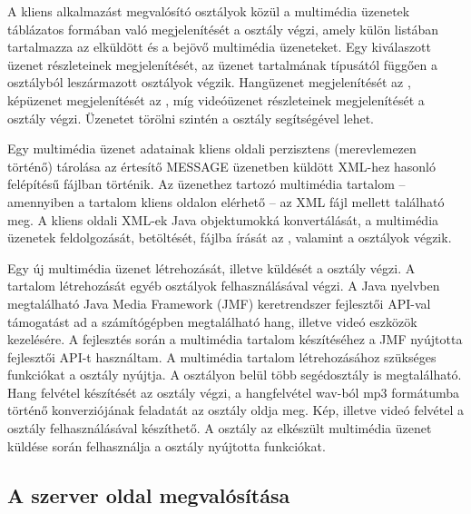 \medskip

A kliens alkalmazást megvalósító osztályok közül a multimédia üzenetek táblázatos formában való megjelenítését a  osztály végzi, amely külön listában tartalmazza az elküldött és a bejövő multimédia üzeneteket. Egy kiválaszott üzenet részleteinek megjelenítését, az üzenet tartalmának típusától függően a  osztályból leszármazott osztályok végzik. Hangüzenet megjelenítését az , képüzenet megjelenítését az , míg videóüzenet részleteinek megjelenítését a  osztály végzi. Üzenetet törölni szintén a  osztály segítségével lehet. 

\medskip

Egy multimédia üzenet adatainak kliens oldali perzisztens (merevlemezen történő) tárolása az értesítő MESSAGE üzenetben küldött XML-hez hasonló felépítésű fájlban történik. Az üzenethez tartozó multimédia tartalom -- amennyiben a tartalom kliens oldalon elérhető -- az XML fájl mellett található meg. A kliens oldali XML-ek Java objektumokká konvertálását, a multimédia üzenetek feldolgozását, betöltését, fájlba írását az , valamint a  osztályok végzik.

\medskip

Egy új multimédia üzenet létrehozását, illetve küldését a  osztály végzi. A tartalom létrehozását egyéb osztályok felhasználásával végzi. A Java nyelvben megtalálható Java Media Framework (JMF) keretrendszer \cite{jmf} fejlesztői API-val támogatást ad a számítógépben megtalálható hang, illetve videó eszközök kezelésére. A fejlesztés során a multimédia tartalom készítéséhez a JMF nyújtotta fejlesztői API-t használtam. A multimédia tartalom létrehozásához szükséges funkciókat a  osztály nyújtja. A  osztályon belül több segédosztály is megtalálható. Hang felvétel készítését az  osztály végzi, a hangfelvétel wav-ból mp3 formátumba történő konverziójának feladatát az  osztály oldja meg. Kép, illetve videó felvétel a  osztály felhasználásával készíthető. A  osztály az elkészült multimédia üzenet küldése során felhasználja a  osztály nyújtotta funkciókat.


\subsection{A szerver oldal megvalósítása}

